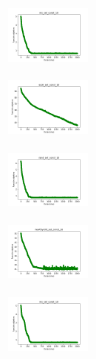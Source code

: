 \vspace*{\fill}
\newpage
\vspace*{\fill}

\begin{figure}[H]
    \centering
    \begin{subfigure}
        \centering
        \includegraphics[width=0.234\textwidth]{img/aggun/iris_set_const_10_949004259_cost.png}
    \end{subfigure}
    \hfill
    \begin{subfigure}
        \centering
        \includegraphics[width=0.234\textwidth]{img/aggun/ecoli_set_const_10_949004259_cost.png}
    \end{subfigure}
    \hfill
    \begin{subfigure}
        \centering
        \includegraphics[width=0.234\textwidth]{img/aggun/rand_set_const_10_949004259_cost.png}
    \end{subfigure}
    \hfill
    \begin{subfigure}
        \centering
        \includegraphics[width=0.234\textwidth]{img/aggun/newthyroid_set_const_10_949004259_cost.png}
    \end{subfigure}
    \hfill
    \begin{subfigure}
        \centering
        \includegraphics[width=0.234\textwidth]{img/aggun/iris_set_const_10_589741062_cost.png}

\end{subfigure}
\end{figure}
